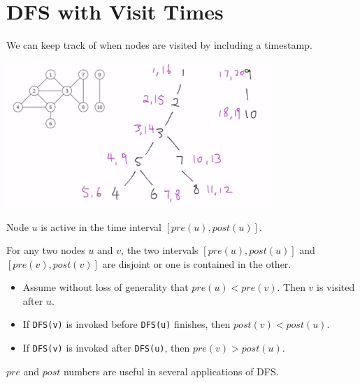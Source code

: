 \documentclass[12pt]{article}
\begin{document}
\section{DFS with Visit Times}
\begin{itemize}
    \item We can keep track of when nodes are visited by including a timestamp.
    \item[] 
    \begin{center}
        \item[] \includegraphics[width=0.75\textwidth]{images/undirected-dfs-tree-time.jpg}
    \end{center}
    \item Node $u$ is active in the time interval $[ pre(u), post(u) ]$.
    \item For any two nodes $u$ and $v$, the two intervals $[pre(u), post(u)]$ and $[pre(v), post(v)]$ are disjoint or one is contained in the other.
    \begin{itemize}
        \item Assume without loss of generality that $pre(u) < pre(v)$. Then $v$ is visited after $u$.
        \item If \texttt{DFS(v)} is invoked before \texttt{DFS(u)} finishes, then $post(v) < post(u)$.
        \item If \texttt{DFS(v)} is invoked after \texttt{DFS(u)}, then $pre(v) > post(u)$.
    \end{itemize}
    \item $pre$ and $post$ numbers are useful in several applications of DFS.
\end{itemize}
\end{document}
